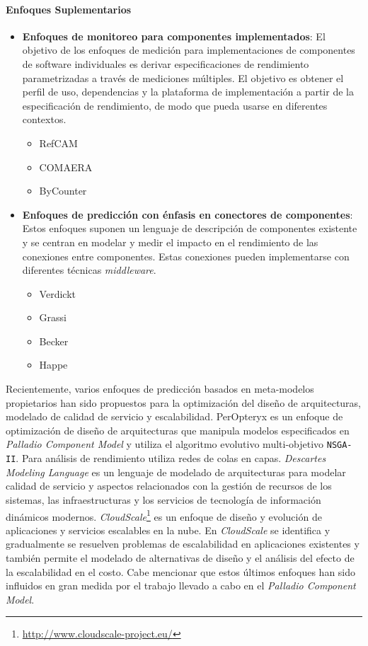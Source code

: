 \paragraph{Enfoques Suplementarios}
\begin{itemize}
    \item \textbf{Enfoques de monitoreo para componentes implementados}: El objetivo de los enfoques de medición para implementaciones de componentes de software individuales es derivar especificaciones de rendimiento parametrizadas a través de mediciones múltiples. El objetivo es obtener el perfil de uso, dependencias y la plataforma de implementación a partir de la especificación de rendimiento, de modo que pueda usarse en diferentes contextos. 
    \begin{itemize}
        \item RefCAM
        \item COMAERA
        \item ByCounter
    \end{itemize}
    \item \textbf{Enfoques de predicción con énfasis en conectores de componentes}: Estos enfoques suponen un lenguaje de descripción de componentes existente y se centran en modelar y medir el impacto en el rendimiento de las conexiones entre componentes. Estas conexiones pueden implementarse con diferentes técnicas \emph{middleware}.
    \begin{itemize}
        \item Verdickt
        \item Grassi
        \item Becker
        \item Happe
    \end{itemize}        
\end{itemize}

Recientemente, varios enfoques de predicción basados en meta-modelos propietarios han sido propuestos para la optimización del diseño de arquitecturas, modelado de calidad de servicio y escalabilidad. PerOpteryx\cite{Koziolek:2011:PAA:2000259.2000267} es un enfoque de optimización de diseño de arquitecturas que manipula modelos especificados en \emph{Palladio Component Model}\cite{Reussner:2016:MSS:3036121} y utiliza el algoritmo evolutivo multi-objetivo \texttt{NSGA-II}. Para análisis de rendimiento utiliza redes de colas en capas. \emph{Descartes Modeling Language}\cite{KoBrHu2014-TechReport-DML} es un lenguaje de modelado de arquitecturas para modelar calidad de servicio y aspectos relacionados con la gestión de recursos de los sistemas, las infraestructuras y los servicios de tecnología de información dinámicos modernos. \emph{CloudScale}\footnote{\url{http://www.cloudscale-project.eu/}}\cite{Brataas:2013:CSM:2479871.2479920} es un enfoque de diseño y evolución de aplicaciones y servicios escalables en la nube. En \emph{CloudScale} se identifica y gradualmente se resuelven problemas de escalabilidad en aplicaciones existentes y también permite el modelado de alternativas de diseño y el análisis del efecto de la escalabilidad en el costo. Cabe mencionar que estos últimos enfoques han sido influidos en gran medida por el trabajo llevado a cabo en el \emph{Palladio Component Model}.


